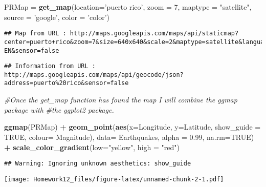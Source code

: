 \documentclass[]{article}
\newenvironment{Shaded}{\begin{snugshade}}{\end{snugshade}}
\newcommand{\KeywordTok}[1]{\textcolor[rgb]{0.13,0.29,0.53}{\textbf{#1}}}
\newcommand{\DataTypeTok}[1]{\textcolor[rgb]{0.13,0.29,0.53}{#1}}
\newcommand{\DecValTok}[1]{\textcolor[rgb]{0.00,0.00,0.81}{#1}}
\newcommand{\FloatTok}[1]{\textcolor[rgb]{0.00,0.00,0.81}{#1}}
\newcommand{\StringTok}[1]{\textcolor[rgb]{0.31,0.60,0.02}{#1}}
\newcommand{\CommentTok}[1]{\textcolor[rgb]{0.56,0.35,0.01}{\textit{#1}}}
\newcommand{\OtherTok}[1]{\textcolor[rgb]{0.56,0.35,0.01}{#1}}
\newcommand{\OperatorTok}[1]{\textcolor[rgb]{0.81,0.36,0.00}{\textbf{#1}}}
\newcommand{\NormalTok}[1]{#1}
\begin{document}
\begin{Shaded}
\begin{Highlighting}[]
\NormalTok{PRMap =}\StringTok{ }\KeywordTok{get_map}\NormalTok{(}\DataTypeTok{location=}\StringTok{'puerto rico'}\NormalTok{, }\DataTypeTok{zoom =} \DecValTok{7}\NormalTok{, }\DataTypeTok{maptype =} \StringTok{"satellite"}\NormalTok{, }\DataTypeTok{source =} \StringTok{'google'}\NormalTok{, }\DataTypeTok{color =} \StringTok{'color'}\NormalTok{)}
\end{Highlighting}
\end{Shaded}

\begin{verbatim}
## Map from URL : http://maps.googleapis.com/maps/api/staticmap?center=puerto+rico&zoom=7&size=640x640&scale=2&maptype=satellite&language=en-EN&sensor=false
\end{verbatim}

\begin{verbatim}
## Information from URL : http://maps.googleapis.com/maps/api/geocode/json?address=puerto%20rico&sensor=false
\end{verbatim}

\begin{Shaded}
\begin{Highlighting}[]
\CommentTok{#Once the get_map function has found the map I will combine the ggmap package with }
\CommentTok{#the ggplot2 package. }

\KeywordTok{ggmap}\NormalTok{(PRMap) }\OperatorTok{+}\StringTok{ }\KeywordTok{geom_point}\NormalTok{(}\KeywordTok{aes}\NormalTok{(}\DataTypeTok{x=}\NormalTok{Longitude, }\DataTypeTok{y=}\NormalTok{Latitude, }\DataTypeTok{show_guide =} \OtherTok{TRUE}\NormalTok{, }\DataTypeTok{colour=}\NormalTok{ Magnitude),}
                  \DataTypeTok{data=}\NormalTok{ Earthquakes, }\DataTypeTok{alpha =} \FloatTok{0.99}\NormalTok{, }\DataTypeTok{na.rm=}\OtherTok{TRUE}\NormalTok{) }\OperatorTok{+}\StringTok{ }\KeywordTok{scale_color_gradient}\NormalTok{(}\DataTypeTok{low=}\StringTok{"yellow"}\NormalTok{, }\DataTypeTok{high =} \StringTok{"red"}\NormalTok{)}
\end{Highlighting}
\end{Shaded}

\begin{verbatim}
## Warning: Ignoring unknown aesthetics: show_guide
\end{verbatim}

\texttt{[image: Homework12\_files/figure-latex/unnamed-chunk-2-1.pdf]}
\end{document}
